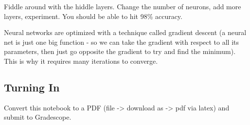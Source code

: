 \documentclass[11pt]{article}
\begin{document}
    Fiddle around with the hiddle layers. Change the number of neurons, add
more layers, experiment. You should be able to hit 98\% accuracy.

    Neural networks are optimized with a technique called gradient descent
(a neural net is just one big function - so we can take the gradient
with respect to all its parameters, then just go opposite the gradient
to try and find the minimum). This is why it requires many iterations to
converge.

    \hypertarget{turning-in}{%
\subsection{Turning In}\label{turning-in}}

    Convert this notebook to a PDF (file -\textgreater{} download as
-\textgreater{} pdf via latex) and submit to Gradescope.


    
    
    
    
\end{document}
